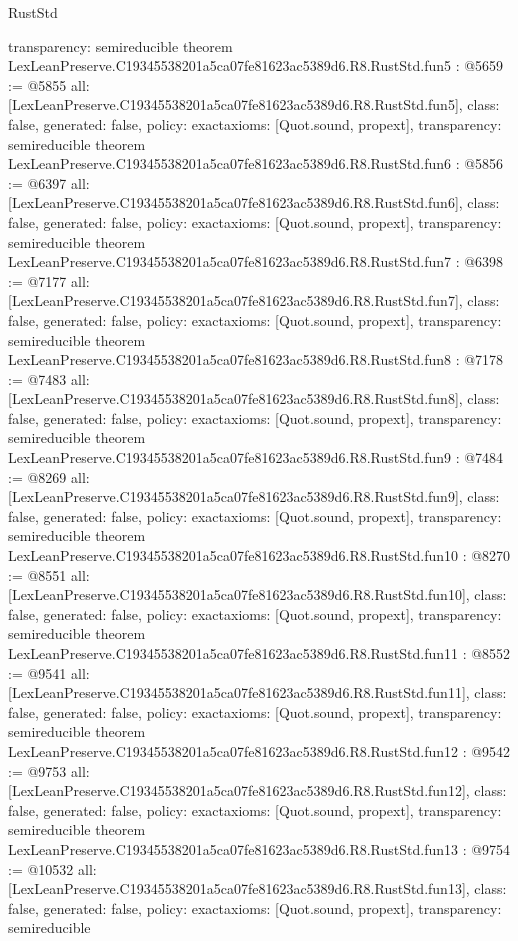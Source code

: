 \begin{lexlean}{RustStd}
\begin{coremodule}
{  transparency: semireducible
}
theorem LexLeanPreserve.C19345538201a5ca07fe81623ac5389d6.R8.RustStd.fun5 : @5659 := @5855 {
  all: [LexLeanPreserve.C19345538201a5ca07fe81623ac5389d6.R8.RustStd.fun5],
  class: false,
  generated: false,
  policy: exact{axioms: [Quot.sound, propext]},
  transparency: semireducible
}
theorem LexLeanPreserve.C19345538201a5ca07fe81623ac5389d6.R8.RustStd.fun6 : @5856 := @6397 {
  all: [LexLeanPreserve.C19345538201a5ca07fe81623ac5389d6.R8.RustStd.fun6],
  class: false,
  generated: false,
  policy: exact{axioms: [Quot.sound, propext]},
  transparency: semireducible
}
theorem LexLeanPreserve.C19345538201a5ca07fe81623ac5389d6.R8.RustStd.fun7 : @6398 := @7177 {
  all: [LexLeanPreserve.C19345538201a5ca07fe81623ac5389d6.R8.RustStd.fun7],
  class: false,
  generated: false,
  policy: exact{axioms: [Quot.sound, propext]},
  transparency: semireducible
}
theorem LexLeanPreserve.C19345538201a5ca07fe81623ac5389d6.R8.RustStd.fun8 : @7178 := @7483 {
  all: [LexLeanPreserve.C19345538201a5ca07fe81623ac5389d6.R8.RustStd.fun8],
  class: false,
  generated: false,
  policy: exact{axioms: [Quot.sound, propext]},
  transparency: semireducible
}
theorem LexLeanPreserve.C19345538201a5ca07fe81623ac5389d6.R8.RustStd.fun9 : @7484 := @8269 {
  all: [LexLeanPreserve.C19345538201a5ca07fe81623ac5389d6.R8.RustStd.fun9],
  class: false,
  generated: false,
  policy: exact{axioms: [Quot.sound, propext]},
  transparency: semireducible
}
theorem LexLeanPreserve.C19345538201a5ca07fe81623ac5389d6.R8.RustStd.fun10 : @8270 := @8551 {
  all: [LexLeanPreserve.C19345538201a5ca07fe81623ac5389d6.R8.RustStd.fun10],
  class: false,
  generated: false,
  policy: exact{axioms: [Quot.sound, propext]},
  transparency: semireducible
}
theorem LexLeanPreserve.C19345538201a5ca07fe81623ac5389d6.R8.RustStd.fun11 : @8552 := @9541 {
  all: [LexLeanPreserve.C19345538201a5ca07fe81623ac5389d6.R8.RustStd.fun11],
  class: false,
  generated: false,
  policy: exact{axioms: [Quot.sound, propext]},
  transparency: semireducible
}
theorem LexLeanPreserve.C19345538201a5ca07fe81623ac5389d6.R8.RustStd.fun12 : @9542 := @9753 {
  all: [LexLeanPreserve.C19345538201a5ca07fe81623ac5389d6.R8.RustStd.fun12],
  class: false,
  generated: false,
  policy: exact{axioms: [Quot.sound, propext]},
  transparency: semireducible
}
theorem LexLeanPreserve.C19345538201a5ca07fe81623ac5389d6.R8.RustStd.fun13 : @9754 := @10532 {
  all: [LexLeanPreserve.C19345538201a5ca07fe81623ac5389d6.R8.RustStd.fun13],
  class: false,
  generated: false,
  policy: exact{axioms: [Quot.sound, propext]},
  transparency: semireducible
}
\end{coremodule}
\end{lexlean}
